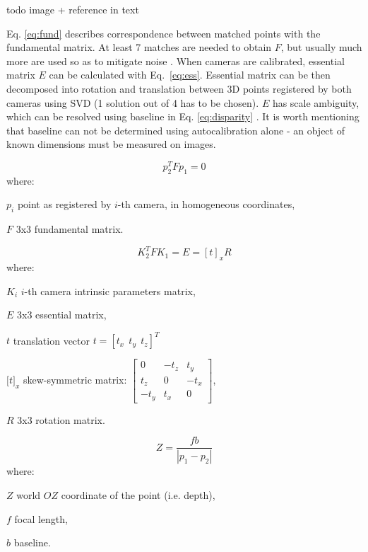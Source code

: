 todo image + reference in text

Eq. \ref{eq:fund} describes correspondence between matched points with the fundamental matrix. At least 7 matches are needed to obtain $F$, but usually much more are used so as to mitigate noise \cite{zhang1998determining}. When cameras are calibrated, essential matrix $E$ can be calculated with Eq.~\ref{eq:ess}. Essential matrix can be then decomposed into rotation and translation between 3D points registered by both cameras using SVD (1 solution out of 4 has to be chosen). $E$ has scale ambiguity, which can be resolved using baseline in Eq. \ref{eq:disparity} \cite{improving}. It is worth mentioning that baseline can not be determined using autocalibration alone - an object of known dimensions must be measured on images.

\begin{equation}
p_{2}^{T}Fp_{1}=0
\label{eq:fund}
\end{equation}
where:
\begin{eqwhere}[2cm]
	\item[$p_{i}$] point as registered by $i$-th camera, in homogeneous coordinates,
	\item[$F$] 3x3 fundamental matrix.
\end{eqwhere}

\begin{equation}
K_{2}^{T}FK_{1}=E=[t]_{x}R
\label{eq:ess}
\end{equation}
where:
\begin{eqwhere}[2cm]
	\item[$K_{i}$] $i$-th camera intrinsic parameters matrix,
	\item[$E$] 3x3 essential matrix,
	\item[$t$] translation vector $t=[t_{x}\ \ t_{y}\ \ t_{z}]^T$
	\item[$\lbrack t \rbrack _{x}$] skew-symmetric matrix: $\begin{bmatrix}
		0 & -t_{z} & t_{y} \\ 
		t_{z} & 0 & -t_{x} \\ 
		-t_{y} & t_{x} & 0
	\end{bmatrix}$,
	\item[$R$] 3x3 rotation matrix.
\end{eqwhere}

\begin{equation}
Z = \frac{fb}{|p_{1}-p_{2}|}
\label{eq:disparity}
\end{equation}
where:
\begin{eqwhere}[2cm]
	\item[$Z$] world $OZ$ coordinate of the point (i.e. depth),
	\item[$f$] focal length,
	\item[$b$] baseline.
\end{eqwhere}

